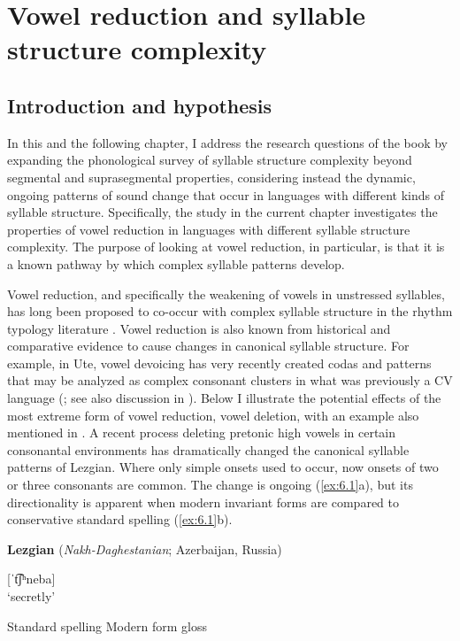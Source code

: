 \chapter{Vowel reduction and syllable structure complexity}\label{sec:6}
\section{Introduction and hypothesis}\label{sec:6.1}

  In this and the following chapter, I address the research questions of the book by expanding the phonological survey of syllable structure complexity beyond segmental and suprasegmental properties, considering instead the dynamic, ongoing patterns of sound change that occur in languages with different kinds of syllable structure. Specifically, the study in the current chapter investigates the properties of vowel reduction in languages with different syllable structure complexity. The purpose of looking at vowel reduction, in particular, is that it is a known pathway by which complex syllable patterns develop.

  Vowel reduction, and specifically the weakening of vowels in unstressed syllables, has long been proposed to co-occur with complex syllable structure in the rhythm typology literature \citep{Auer1993}. Vowel reduction is also known from historical and comparative evidence to cause changes in canonical syllable structure. For example, in Ute, vowel devoicing has very recently created codas and patterns that may be analyzed as complex consonant clusters in what was previously a CV language (\citealt{Givón2011}; see also discussion in ). Below I illustrate the potential effects of the most extreme form of vowel reduction, vowel deletion, with an example also mentioned in . A recent process deleting pretonic high vowels in certain consonantal environments has dramatically changed the canonical syllable patterns of Lezgian. Where only simple onsets used to occur, now onsets of two or three consonants are common. The change is ongoing (\ref{ex:6.1}a), but its directionality is apparent when modern invariant forms are compared to conservative standard spelling (\ref{ex:6.1}b).

\ea\label{ex:6.1}
  \textbf{Lezgian} (\textit{Nakh-Daghestanian}; Azerbaijan, Russia)

\ea  [t͡ʃʰiˈneba] {\textasciitilde} [ˈt͡ʃʰneba]\\
\glt ‘secretly’

\ex  Standard spelling  Modern form    gloss

